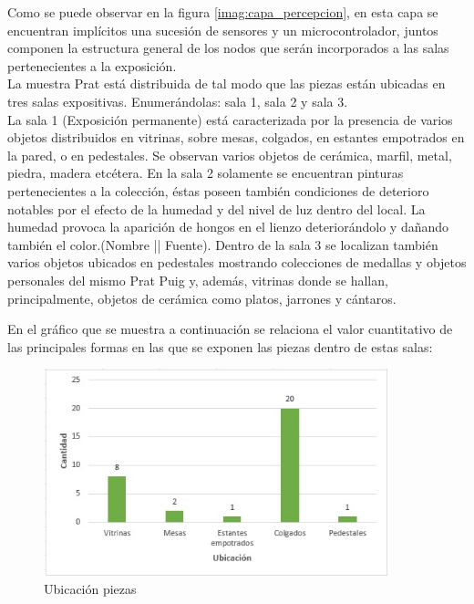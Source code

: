     Como se puede observar en la figura \ref{imag:capa_percepcion}, en esta capa se encuentran implícitos una sucesión de sensores y un microcontrolador, juntos componen la estructura general de los nodos que serán incorporados a las salas pertenecientes a la exposición.\\


    La muestra Prat está distribuida de tal modo que las piezas están ubicadas en tres salas expositivas. Enumerándolas: sala 1, sala 2 y sala 3.\\
    La sala 1 (Exposición permanente) está caracterizada por la presencia de varios objetos distribuidos en vitrinas, sobre mesas, colgados, en estantes empotrados en la pared, o en pedestales. Se observan varios objetos de cerámica, marfil, metal, piedra, madera etcétera.\newline
    En la sala 2 solamente se encuentran pinturas pertenecientes a la colección, éstas poseen también condiciones de deterioro notables por el efecto de la humedad y del nivel de luz dentro del local. La humedad provoca la aparición de hongos en el lienzo deteriorándolo y dañando también el color. (Nombre || Fuente).\newline
    Dentro de la sala 3 se localizan también varios objetos ubicados en pedestales mostrando colecciones de medallas y objetos personales del mismo Prat Puig y, además, vitrinas donde se hallan, principalmente, objetos de cerámica como platos, jarrones y cántaros.\newline

    \vspace{8cm}

    En el gráfico que se muestra a continuación se relaciona el valor cuantitativo de las principales formas en las que se exponen las piezas dentro de estas salas:\newline

    \begin{figure}[h]
        \centering
        \includegraphics[width=10cm, height=6cm]{imagenes/formas expositivas.jpg}
        \caption{Ubicación piezas}
        \label{imag:ubicacion_piezas}
    \end{figure}

